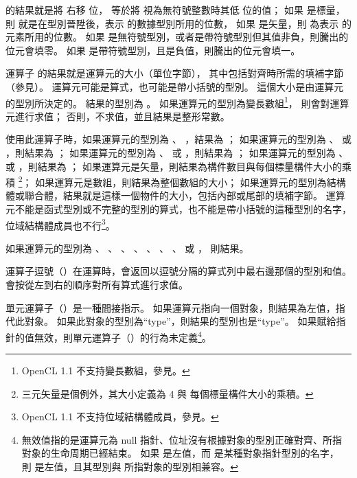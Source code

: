 { 的結果就是將  右移  位，
  等於將  視為無符號整數時其低  位的值；
如果  是標量，則  就是在型別晉陞後，表示  的數據型別所用的位數，
如果  是矢量，則  為表示  的元素所用的位數。
如果  是無符號型別，或者是帶符號型別但其值非負，則騰出的位元會填零。
如果  是帶符號型別，且是負值，則騰出的位元會填一。
\stopitem

\startitem
運算子  的結果就是運算元的大小（單位字節），
其中包括對齊時所需的填補字節（參見）。
運算元可能是算式，也可能是帶小括號的型別。
這個大小是由運算元的型別所決定的。
結果的型別為 。
如果運算元的型別為變長數組\footnote{OpenCL 1.1 不支持變長數組，參見。}，
則會對運算元進行求值；
否則，不求值，並且結果是整形常數。

使用此運算子時，如果運算元的型別為 、 ，結果為 ；
如果運算元的型別為 、  或 ，則結果為 ；
如果運算元的型別為 、  或 ，則結果為 ；
如果運算元的型別為 、  或 ，則結果為 ；
如果運算元是矢量，則結果為構件數目與每個標量構件大小的乘積
\footnote{三元矢量是個例外，其大小定義為 4 與 每個標量構件大小的乘積。}；
如果運算元是數組，則結果為整個數組的大小；
如果運算元的型別為結構體或聯合體，結果就是這樣一個物件的大小，包括內部或尾部的填補字節。
運算元不能是函式型別或不完整的型別的算式，也不能是帶小括號的這種型別的名字，
位域結構體成員也不行\footnote{OpenCL 1.1 不支持位域結構體成員，參見。}。

如果運算元的型別為 、 、 、
 、 、 、
 、  或 ，
則結果。
\stopitem

\startitem
運算子逗號（\ccmm{,}）在運算時，會返回以逗號分隔的算式列中最右邊那個的型別和值。
會按從左到右的順序對所有算式進行求值。
\stopitem

\startitem
單元運算子（\ccmm{*}）是一種間接指示。
如果運算元指向一個對象，則結果為左值，指代此對象。
如果此對象的型別為“type”，則結果的型別也是“type”。
如果賦給指針的值無效，則單元運算子（\ccmm{*}）的行為未定義\footnote{
無效值指的是運算元為 null 指針、位址沒有根據對象的型別正確對齊、所指對象的生命周期已經結束。
如果  是左值，而  是某種對象指針型別的名字，
則  是左值，且其型別與  所指對象的型別相兼容。
}。
\stopitem

}

